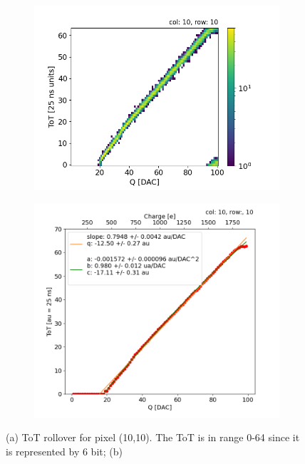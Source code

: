         \begin{figure}[h!]
            \begin{subfigure}{.5\textwidth}
            \centering
            \includegraphics[width=.98\linewidth]{figures/charaterization/ToT_rollover.png}
            \label{fig:}
            \end{subfigure}
            \begin{subfigure}{.5\textwidth}
            \centering
            \includegraphics[width=.98\linewidth]{figures/charaterization/ToT_injection.png}
            \label{fig:}
            \end{subfigure}
            \caption{(a) ToT rollover for pixel (10,10). The ToT is in range 0-64 since it is represented by 6 bit; (b)}
        \end{figure}    


